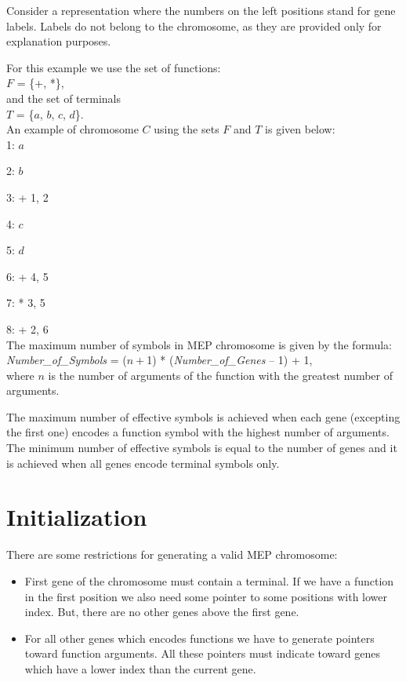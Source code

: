\documentclass [11pt]{article}
\begin{document}
Consider a representation where the numbers on the left positions stand for 
gene labels. Labels do not belong to the chromosome, as they are provided 
only for explanation purposes.

For this example we use the set of functions:\\

$F$ = {\{}+, *{\}},\\

\noindent
and the set of terminals\\

$T$ = {\{}$a$, $b$, $c$, $d${\}}.\\

An example of chromosome $C$ using the sets $F$ and $T$ is given below:\\

1: $a$

2: $b$

3: + 1, 2

4: $c$

5: $d$

6: + 4, 5

7: * 3, 5

8: + 2, 6\\

The maximum number of symbols in MEP chromosome is given by the formula:\\

\textit{Number{\_}of{\_}Symbols} = ($n + $1) * (\textit{Number{\_}of{\_}Genes} -- 1) + 1, \\

\noindent
where $n$ is the number of arguments of the function with the greatest number 
of arguments. 

The maximum number of effective symbols is achieved when each gene 
(excepting the first one) encodes a function symbol with the highest number 
of arguments. The minimum number of effective symbols is equal to the number 
of genes and it is achieved when all genes encode terminal symbols only.\\


\section{Initialization}
\label{MEP_initialization}

There are some restrictions for generating a valid MEP chromosome:

\begin{itemize}

\item{First gene of the chromosome must contain a terminal. If we have a function in the first position we also need some pointer to some positions with lower index. But, there are no other genes above the first gene.}
\item{For all other genes which encodes functions we have to generate pointers toward function arguments. All these pointers must indicate toward genes which have a lower index than the current gene.}

\end{itemize}
\end{document}
